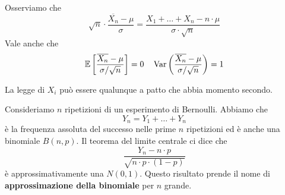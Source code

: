 \begin{observation}
	Osserviamo che
	\[
		\sqrt{n} \cdot \frac{\overline{X_n} - \mu}{\sigma} =
		\frac{X_1 + \dots + X_n - n \cdot \mu}{\sigma \cdot \sqrt{n}}
	\]
	Vale anche che
	\[
		\mathbb{E} \left[ \frac{\overline{X_n} - \mu}{\sigma / \sqrt{n}} \right] = 0 \quad
		\operatorname{Var} \left( \frac{\overline{X_n} - \mu}{\sigma / \sqrt{n}} \right) = 1
	\]
\end{observation}

\begin{observation}
	La legge di $X_i$ può essere qualunque a patto che abbia momento secondo.
\end{observation}

\begin{example}
	Consideriamo $n$ ripetizioni di un esperimento di Bernoulli. Abbiamo che
	\[ Y_n = Y_1 + \dots + Y_n \]
	è la frequenza assoluta del successo nelle prime $n$ ripetizioni ed è anche una binomiale
	$B(n,p)$. Il teorema del limite centrale ci dice che
	\[ \frac{Y_n - n \cdot p}{\sqrt{n \cdot p \cdot (1-p)}} \]
	è approssimativamente una $N(0,1)$. Questo risultato prende il nome di
	\textbf{approssimazione della binomiale} per $n$ grande.
\end{example}

